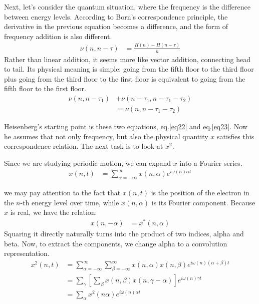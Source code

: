 \documentclass[a4paper, 12pt, oneside, onecolumn]{article}
\begin{document}
\begin{multicols}{2}
Next, let's consider the quantum situation, where the frequency is the difference between energy levels. According to Born's correspondence principle, the derivative in the previous equation becomes a difference, and the form of frequency addition is also different.
\begin{align}
	\nu \left( n, n - \tau \right)
	&= \frac{H \left( n \right) - H \left( n - \tau \right) }{h} \label{eq22}
\end{align}
Rather than linear addition, it seems more like vector addition, connecting head to tail. Its physical meaning is simple: going from the fifth floor to the third floor plus going from the third floor to the first floor is equivalent to going from the fifth floor to the first floor.
\begin{align}
	\nu \left( n, n - \tau_1 \right) 
	&+ \nu \left( n - \tau_1, n - \tau_1 - \tau_2 \right) \nonumber \\
	&= \nu \left( n, n - \tau_1 - \tau_2 \right)\label{eq23}
\end{align}

Heisenberg's starting point is these two equations, eq.\ref{eq22} and eq.\ref{eq23}. Now he assumes that not only frequency, but also the physical quantity $x$ satisfies this correspondence relation. The next task is to look at $x^2$.

Since we are studying periodic motion, we can expand $x$ into a Fourier series.
\begin{align}
	x \left( n, t \right)
	&= \sum_{\alpha = - \infty}^{\infty} x \left( n, \alpha \right) e^{i \omega \left( n \right) \alpha t}
\end{align}

we may pay attention to the fact that $x \left( n, t \right)$ is the position of the electron in the $n$-th energy level over time, while $x \left( n, \alpha \right)$ is its Fourier component. Because $x$ is real, we have the relation:
\begin{align}
	x \left( n, -\alpha \right)
	&= x^{\ast} \left( n, \alpha \right)
\end{align}
Squaring it directly naturally turns into the product of two indices, alpha and beta. Now, to extract the components, we change alpha to a convolution representation.
\begin{align}
	x^2 \left( n, t \right)
	&= \sum_{\alpha = - \infty}^{\infty} \sum_{\beta = - \infty}^{\infty} x \left( n, \alpha \right) x \left( n, \beta \right) e^{i \omega \left( n \right) \left( \alpha + \beta \right) t} \nonumber \\
	&= \sum_\gamma \left[ \sum_\beta x \left( n, \beta \right) x \left( n, \gamma - \alpha \right) \right] e^{i \omega \left( n \right) \gamma t} \nonumber \\
	&= \sum_\alpha x^2 \left( n \alpha \right) e^{i \omega \left( n \right) \alpha t}
\end{align}


\end{multicols}
\end{document}
